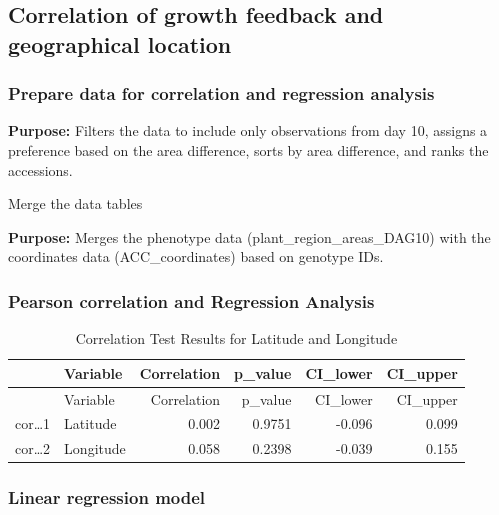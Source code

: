 \documentclass[
  11pt,
]{article}
\begin{document}
\subsection{Correlation of growth feedback and geographical
location}\label{correlation-of-growth-feedback-and-geographical-location}

\subsubsection{Prepare data for correlation and regression
analysis}\label{prepare-data-for-correlation-and-regression-analysis}

\textbf{Purpose:} Filters the data to include only observations from day
10, assigns a preference based on the area difference, sorts by area
difference, and ranks the accessions.

Merge the data tables

\textbf{Purpose:} Merges the phenotype data
(plant\_region\_areas\_DAG10) with the coordinates data
(ACC\_coordinates) based on genotype IDs.

\subsubsection{\texorpdfstring{\textbf{Pearson correlation} and
Regression
Analysis}{Pearson correlation and Regression Analysis}}\label{pearson-correlation-and-regression-analysis}

\begin{longtable}[]{@{}llrrrr@{}}
\caption{Correlation Test Results for Latitude and
Longitude}\tabularnewline
\toprule\noalign{}
& Variable & Correlation & p\_value & CI\_lower & CI\_upper \\
\midrule\noalign{}
\endfirsthead
\toprule\noalign{}
& Variable & Correlation & p\_value & CI\_lower & CI\_upper \\
\midrule\noalign{}
\endhead
\bottomrule\noalign{}
\endlastfoot
cor\ldots1 & Latitude & 0.002 & 0.9751 & -0.096 & 0.099 \\
cor\ldots2 & Longitude & 0.058 & 0.2398 & -0.039 & 0.155 \\
\end{longtable}

\subsubsection{\texorpdfstring{\textbf{Linear regression
model}}{Linear regression model}}\label{linear-regression-model}
\end{document}

